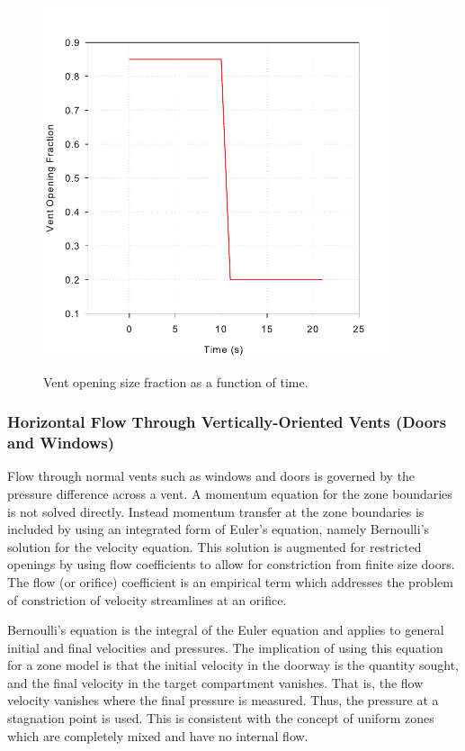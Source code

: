 \begin{figure}[t]
\begin{center}
\includegraphics[width=4.0in]{FIGURES/Theory/Opening_Fraction}\\
\end{center}
\caption{Vent opening size fraction as a function of time.}
 \label{fig:Opening_Fraction}
\end{figure}

\subsubsection{Horizontal Flow Through Vertically-Oriented Vents (Doors and Windows)}

Flow through normal vents such as windows and doors is governed by the pressure difference across a vent.  A momentum equation for the zone boundaries is not solved directly.  Instead momentum transfer at the zone boundaries is included by using an integrated form of Euler's equation, namely Bernoulli's solution for the velocity equation.  This solution is augmented for restricted openings by using flow coefficients \cite{Quintiere:1984, Steckler_Coefficients} to allow for constriction from finite size doors.  The flow (or orifice) coefficient is an empirical term which addresses the problem of constriction of velocity streamlines at an orifice.

Bernoulli's equation is the integral of the Euler equation and applies to general initial and final velocities and pressures.  The implication of using this equation for a zone model is that the initial velocity in the doorway is the quantity sought, and the final velocity in the target compartment vanishes.  That is, the flow velocity vanishes where the final pressure is measured.  Thus, the pressure at a stagnation point is used.  This is consistent with the concept of uniform zones which are completely mixed and have no internal flow.

